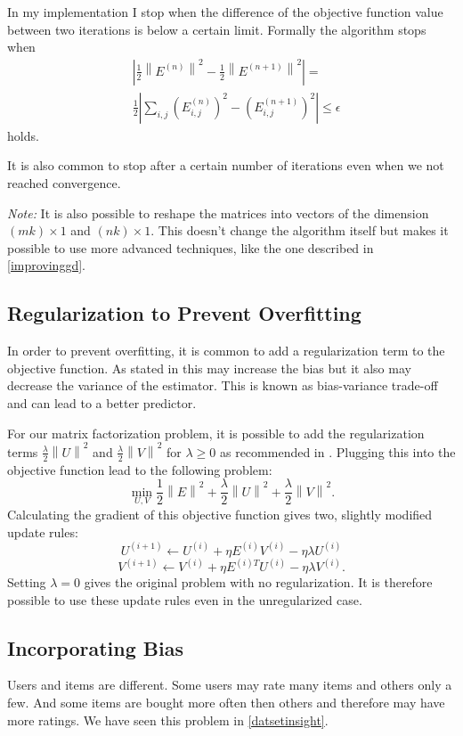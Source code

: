 \documentclass[DIV=14,twocolumn]{scrartcl}
\newcommand{\norm}[1]{\left\lVert#1\right\rVert}
\begin{document}
In my implementation I stop when the difference of the objective function value between two iterations is below a certain limit. Formally the algorithm stops when
\begin{equation*}
\begin{split}
&\left|\frac{1}{2}\norm{E^{(n)}}^2-\frac{1}{2}\norm{E^{(n+1)}}^2\right| =\\
&\frac{1}{2} \left| \sum_{i,j}(E_{i,j}^{(n)})^2-(E_{i,j}^{(n+1)})^2 \right| \leq\epsilon
\end{split}
\end{equation*} $$$$ holds.

It is also common to stop after a certain number of iterations even when we not reached convergence.

\textit{Note:} It is also possible to reshape the matrices into vectors of the dimension $(mk)\times1$ and $(nk)\times1$. This doesn't change the algorithm itself but makes it possible to use more advanced techniques, like the one described in \autoref{improvinggd}.

\subsection{Regularization to Prevent Overfitting}
In order to prevent overfitting, it is common to add a regularization term to the objective function. As stated in \cite{Gi19} this may increase the bias but it also may decrease the variance of the estimator. This is known as bias-variance trade-off and can lead to a better predictor. 

For our matrix factorization problem, it is possible to add the regularization terms $\frac{\lambda}{2}\norm{U}^2$ and $\frac{\lambda}{2}\norm{V}^2$ for $\lambda \geq 0$ as recommended in \cite{Ag16}.
Plugging this into the objective function lead to the following problem: $$\min_{U,V} \frac{1}{2}\norm{E}^2 + \frac{\lambda}{2}\norm{U}^2 + \frac{\lambda}{2}\norm{V}^2.$$ Calculating the gradient of this objective function gives two, slightly modified update rules: \[U^{(i+1)} \leftarrow U^{(i)} + \eta E^{(i)}V^{(i)} - \eta\lambda U^{(i)}\] \[V^{(i+1)} \leftarrow V^{(i)} + \eta E^{(i)T}U^{(i)} - \eta\lambda V^{(i)}.\]
Setting $\lambda = 0$ gives the original problem with no regularization. It is therefore possible to use these update rules even in the unregularized case.

\subsection{Incorporating Bias}
Users and items are different. Some users may rate many items and others only a few. And some items are bought more often then others and therefore may have more ratings. We have seen this problem in \autoref{datsetinsight}.
 
\end{document}
